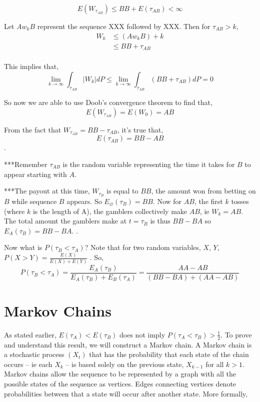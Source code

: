 \documentclass{article}
\numberwithin{mytheorem}{subsection} %
\begin{document}
			$$E(W_{\tau_{AB}}) \leq BB + E(\tau_{AB}) < \infty$$

			Let $Aw_k B$ represent the sequence XXX followed by XXX. Then for $\tau_{AB} > k$,
			\begin{equation}
			\begin{split}
			W_k & \leq (Aw_k B) + k \\
			    & \leq BB + \tau_{AB} \\
			\end{split}
			\end{equation}

			This implies that,
			$$\lim_{k\rightarrow \infty} \int_{\tau_{AB}} |W_k|dP \leq \lim_{k\rightarrow \infty} \int_{\tau_{AB}} (BB + \tau_{AB}) dP = 0$$

			So now we are able to use Doob's convergence theorem to find that,
			$$E(W_{\tau_{AB}}) = E(W_0) = AB$$

			From the fact that $W_{\tau_{AB}} = BB - \tau_{AB}$, it's true that,
			$$E(\tau_{AB}) = BB - AB$$.

			***Remember $\tau_{AB}$ is the random variable representing the time it takes for $B$ to appear starting with $A$.

			***The payout at this time, $W_{\tau_{B}}$ is equal to $BB$, the amount won from betting on $B$ while sequence $B$ appears. So $E_{\varnothing}(\tau_{B}) = BB$. Now for $AB$, the first $k$ tosses (where $k$ is the length of A), the gamblers collectively make $AB$, ie $W_k = AB$. The total amount the gamblers make at $t = \tau_{B}$ is thus $BB - BA$ so $E_A(\tau_{B}) = BB - BA$. \cite{grinstead}.

			Now what is $P(\tau_{B} < \tau_{A})$? Note that for two random variables, $X$, $Y$, $P(X > Y) = \frac{E(X)}{E(X) + E(Y)}$ \cite{grinstead}. So, $$P(\tau_{B} < \tau_{A}) = \frac{E_A(\tau_{B})}{E_A(\tau_{B}) + E_B(\tau_{A})} = \frac{AA - AB}{(BB - BA) + (AA - AB)}$$

	\section{Markov Chains}
		As stated earlier, $E(\tau_A) < E(\tau_B)$ does not imply $P(\tau_A < \tau_B) > \frac{1}{2}$. To prove and understand this result, we will construct a Markov chain. A Markov chain is a stochastic process $(X_t)$ that has the probability that each state of the chain occurs -- ie each $X_k$ -- is based solely on the previous state, $X_{k-1}$ for all $k > 1$. Markov chains allow the sequence to be represented by a graph with all the possible states of the sequence as vertices. Edges connecting vertices denote probabilities between that a state will occur after another state. More formally,
\end{document}
